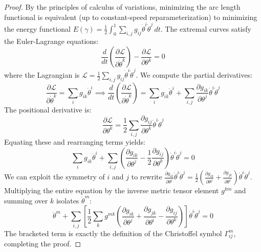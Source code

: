 \begin{proof}
By the principles of calculus of variations, minimizing the arc length functional is equivalent (up to constant-speed reparameterization) to minimizing the energy functional $E(\gamma) = \frac{1}{2} \int_0^1 \sum_{i,j} g_{ij} \dot{\theta}^i \dot{\theta}^j \, dt$. The extremal curves satisfy the Euler-Lagrange equations:
\begin{equation}
\frac{d}{dt} \left( \frac{\partial \mathcal{L}}{\partial \dot{\theta}^k} \right) - \frac{\partial \mathcal{L}}{\partial \theta^k} = 0
\end{equation}
where the Lagrangian is $\mathcal{L} = \frac{1}{2} \sum_{i,j} g_{ij} \dot{\theta}^i \dot{\theta}^j$. We compute the partial derivatives:
\begin{equation}
\frac{\partial \mathcal{L}}{\partial \dot{\theta}^k} = \sum_i g_{ik} \dot{\theta}^i \implies \frac{d}{dt} \left( \frac{\partial \mathcal{L}}{\partial \dot{\theta}^k} \right) = \sum_i g_{ik} \ddot{\theta}^i + \sum_{i,j} \frac{\partial g_{ik}}{\partial \theta^j} \dot{\theta}^i \dot{\theta}^j
\end{equation}
The positional derivative is:
\begin{equation}
\frac{\partial \mathcal{L}}{\partial \theta^k} = \frac{1}{2} \sum_{i,j} \frac{\partial g_{ij}}{\partial \theta^k} \dot{\theta}^i \dot{\theta}^j
\end{equation}
Equating these and rearranging terms yields:
\begin{equation}
\sum_i g_{ik} \ddot{\theta}^i + \sum_{i,j} \left( \frac{\partial g_{ik}}{\partial \theta^j} - \frac{1}{2} \frac{\partial g_{ij}}{\partial \theta^k} \right) \dot{\theta}^i \dot{\theta}^j = 0
\end{equation}
We can exploit the symmetry of $i$ and $j$ to rewrite $\frac{\partial g_{ik}}{\partial \theta^j} \dot{\theta}^i \dot{\theta}^j = \frac{1}{2} \left( \frac{\partial g_{ik}}{\partial \theta^j} + \frac{\partial g_{jk}}{\partial \theta^i} \right) \dot{\theta}^i \dot{\theta}^j$. Multiplying the entire equation by the inverse metric tensor element $g^{km}$ and summing over $k$ isolates $\ddot{\theta}^m$:
\begin{equation}
\ddot{\theta}^m + \sum_{i,j} \left[ \frac{1}{2} \sum_k g^{mk} \left( \frac{\partial g_{ik}}{\partial \theta^j} + \frac{\partial g_{jk}}{\partial \theta^i} - \frac{\partial g_{ij}}{\partial \theta^k} \right) \right] \dot{\theta}^i \dot{\theta}^j = 0
\end{equation}
The bracketed term is exactly the definition of the Christoffel symbol $\Gamma^m_{ij}$, completing the proof.
\end{proof}

